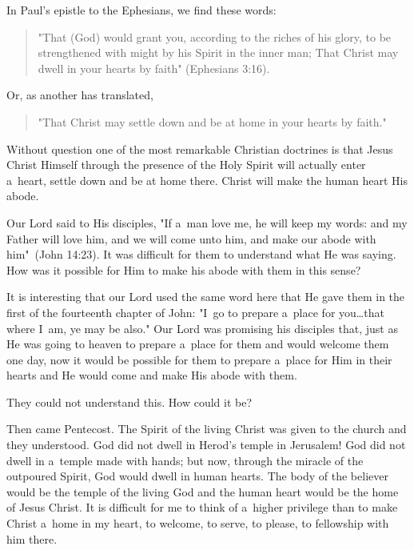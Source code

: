 \documentclass[a4paper,12pt]{article}
\begin{document}
\begin{multicols}{2}

In Paul's epistle to the Ephesians, we find these words: 

\begin{quote}
"That (God) would grant you, according to the riches of 
his glory, to be strengthened with might by his Spirit in 
the inner man; That Christ may dwell in your hearts by 
faith" (Ephesians 3:16).
\end{quote}

Or, as another has translated, 

\begin{quote}
"That Christ may settle down and be at home in your 
hearts by faith." 
\end{quote}

Without question one of the most remarkable Christian doctrines is that Jesus Christ Himself through the presence of the Holy Spirit will actually enter a~heart, settle down and be at home there. Christ will make the 
human heart His abode. 

Our Lord said to His disciples, "If a~man love me, he will keep my words: and my Father will love him, and we will come unto him, and make our abode with him"~(John 14:23). It was difficult for them to understand what He was saying. How was it possible for Him to make his abode with them in this sense? 

It is interesting that our Lord used the same word here that He gave them in the first of the fourteenth chapter of John: "I~go to prepare a~place for you\ldots that where I~am, ye may be also." Our Lord was promising his disciples that, just as He was going to heaven to prepare a~place for them and would welcome them one day, now it would be possible for them to prepare a~place for Him in their hearts and He would come and make His abode with them. 

They could not understand this. How could it be? 

Then came Pentecost. The Spirit of the living Christ was given to the church and they understood. God did not dwell in Herod's temple in Jerusalem! God did not dwell in a~temple made with hands; but now, through the miracle of the outpoured Spirit, God would dwell in human hearts. The body of the believer would be the temple of the living God and the human heart would be the home of Jesus Christ. It is difficult for me to think of a~higher privilege than to make Christ a~home in my heart, to welcome, to serve, to please, to fellowship with him there. 


\end{multicols}
\end{document}

